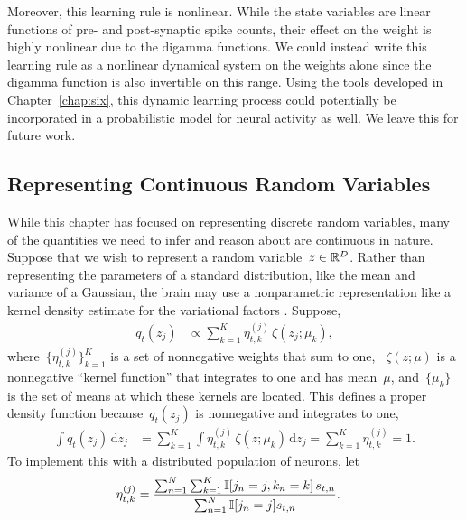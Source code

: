 Moreover, this learning rule is nonlinear. While the state variables
are linear functions of pre- and post-synaptic spike counts, their
effect on the weight is highly nonlinear due to the digamma functions.
We could instead write this learning rule as a nonlinear dynamical
system on the weights alone since the digamma function is also
invertible on this range. Using the tools developed in Chapter~\ref{chap:six}, this
dynamic learning process could potentially be incorporated in a
probabilistic model for neural activity as well.  We leave this for
future work.

\subsection{Representing Continuous Random Variables}
While this chapter has focused on representing discrete random variables,
many of the quantities we need to infer and reason about are continuous
in nature. 
Suppose that we wish to represent a random variable~$z \in \mathbb{R}^D$.
Rather than representing the parameters of a standard distribution, like the
mean and variance of a Gaussian, the brain may use a nonparametric
representation like a kernel density estimate for the variational factors
\citep{Anderson1994, Barber2003}.
Suppose,
\begin{align*}
  q_t(z_j) &\propto
  \sum_{k=1}^K \eta_{t,k}^{(j)} \, \zeta(z_j; \mu_k),
\end{align*}
where~$\{\eta_{t,k}^{(j)}\}_{k=1}^K$ is a set of nonnegative weights that
sum to one, ~$\zeta(z; \mu)$ is a nonnegative ``kernel function''
that integrates to one and has mean~$\mu$, and~$\{\mu_k\}$ is the set of
means at which these kernels are located. This defines a proper
density function because~$q_t(z_j)$ is nonnegative and integrates to one,
\begin{align*}
  \int q_t(z_j) \, \mathrm{d}z_j &=
  \sum_{k=1}^K  \int \eta_{t,k}^{(j)} \, \zeta(z; \mu_k) \, \mathrm{d}z_j
  = \sum_{k=1}^K \eta_{t,k}^{(j)} = 1.
\end{align*}
To implement this with a distributed population of neurons, let
\begin{align*}
  \eta_{t,k}^{(j)} &=
  \frac{\sum_{n=1}^N \sum_{k=1}^K \mathbb{I}[j_n=j, k_n=k] \, s_{t,n}}
       {\sum_{n=1}^N \mathbb{I}[j_n=j] s_{t,n}}.
\end{align*}

